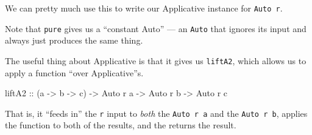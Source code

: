 \documentclass[]{article}
\newenvironment{Shaded}{}{}
\newcommand{\KeywordTok}[1]{\textcolor[rgb]{0.00,0.44,0.13}{\textbf{{#1}}}}
\newcommand{\DataTypeTok}[1]{\textcolor[rgb]{0.56,0.13,0.00}{{#1}}}
\newcommand{\CommentTok}[1]{\textcolor[rgb]{0.38,0.63,0.69}{\textit{{#1}}}}
\newcommand{\OtherTok}[1]{\textcolor[rgb]{0.00,0.44,0.13}{{#1}}}
\newcommand{\FunctionTok}[1]{\textcolor[rgb]{0.02,0.16,0.49}{{#1}}}
\newcommand{\NormalTok}[1]{{#1}}
\begin{document}
We can pretty much use this to write our Applicative instance for
\texttt{Auto\ r}.

\begin{Shaded}
\end{Shaded}

Note that \texttt{pure} gives us a ``constant Auto'' --- an \texttt{Auto} that
ignores its input and always just produces the same thing.

The useful thing about Applicative is that it gives us \texttt{liftA2}, which
allows us to apply a function ``over Applicative''s.

\begin{Shaded}
\begin{Highlighting}[]
\OtherTok{liftA2 ::} \NormalTok{(a }\OtherTok{->} \NormalTok{b }\OtherTok{->} \NormalTok{c) }\OtherTok{->} \DataTypeTok{Auto} \NormalTok{r a }\OtherTok{->} \DataTypeTok{Auto} \NormalTok{r b }\OtherTok{->} \DataTypeTok{Auto} \NormalTok{r c}
\end{Highlighting}
\end{Shaded}

That is, it ``feeds in'' the \texttt{r} input to \emph{both} the
\texttt{Auto\ r\ a} and the \texttt{Auto\ r\ b}, applies the function to both of
the results, and the returns the result.
\end{document}
